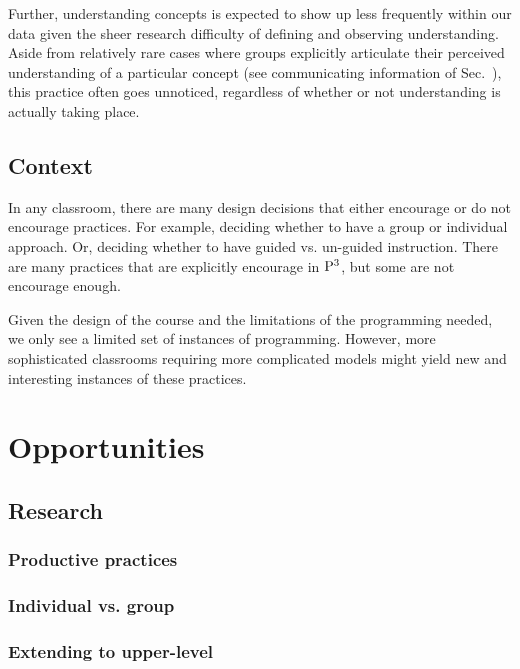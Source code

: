 \documentclass{msuphddissertation}
\begin{document}
\begin{doublespace}
Further, understanding concepts is expected to show up less frequently within our data given the sheer research difficulty of defining and observing understanding.  Aside from relatively rare cases where groups explicitly articulate their perceived understanding of a particular concept (see communicating information of Sec.~), this practice often goes unnoticed, regardless of whether or not understanding is actually taking place.

\subsection{Context}\label{CH6:Context}

In any classroom, there are many design decisions that either encourage or do not encourage practices.  For example, deciding whether to have a group or individual approach.  Or, deciding whether to have guided vs. un-guided instruction.  There are many practices that are explicitly encourage in ${\rm P}^{3}$, but some are not encourage enough.

Given the design of the course and the limitations of the programming needed, we only see a limited set of instances of programming.  However, more sophisticated classrooms requiring more complicated models might yield new and interesting instances of these practices.

\section{Opportunities}


\subsection{Research}


\subsubsection{Productive practices}

\subsubsection{Individual vs. group}

\subsubsection{Extending to upper-level}


\end{doublespace}
\end{document}
